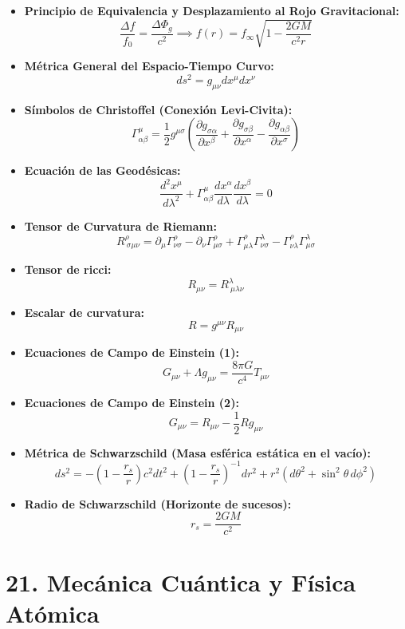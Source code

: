 \documentclass[11pt,a4paper]{article}
\begin{document}
\begin{itemize}
  \item \textbf{Principio de Equivalencia y Desplazamiento al Rojo Gravitacional:}
  \[
    \frac{\Delta f}{f_0} = \frac{\Delta\Phi_g}{c^2} \implies f(r) = f_\infty \sqrt{1 - \frac{2GM}{c^2 r}}
  \]
  \item \textbf{Métrica General del Espacio-Tiempo Curvo:}
  \[
    ds^2 = g_{\mu\nu} dx^\mu dx^\nu
  \]
  \item \textbf{Símbolos de Christoffel (Conexión Levi-Civita):}
  \[
    \Gamma^\mu_{\alpha\beta} = \frac{1}{2} g^{\mu\sigma} \left( \frac{\partial g_{\sigma\alpha}}{\partial x^\beta} + \frac{\partial g_{\sigma\beta}}{\partial x^\alpha} - \frac{\partial g_{\alpha\beta}}{\partial x^\sigma} \right)
  \]
  \item \textbf{Ecuación de las Geodésicas:}
  \[
    \frac{d^2 x^\mu}{d\lambda^2} + \Gamma^\mu_{\alpha\beta} \frac{dx^\alpha}{d\lambda} \frac{dx^\beta}{d\lambda} = 0
  \]
  \item \textbf{Tensor de Curvatura de Riemann:}
  \[
    R^\rho_{\ \sigma\mu\nu} = \partial_\mu \Gamma^\rho_{\nu\sigma} - \partial_\nu \Gamma^\rho_{\mu\sigma} + \Gamma^\rho_{\mu\lambda} \Gamma^\lambda_{\nu\sigma} - \Gamma^\rho_{\nu\lambda} \Gamma^\lambda_{\mu\sigma}
  \]
  \item \textbf{Tensor de ricci:}
  \[
    R_{\mu\nu} = R^\lambda_{\ \mu\lambda\nu}
  \]
  \item \textbf{Escalar de curvatura:}
  \[
    R = g^{\mu\nu} R_{\mu\nu}
  \]
  \item \textbf{Ecuaciones de Campo de Einstein (1):}
  \[
    G_{\mu\nu} + \Lambda g_{\mu\nu} = \frac{8\pi G}{c^4} T_{\mu\nu}
  \]
  \item \textbf{Ecuaciones de Campo de Einstein (2):}
  \[
    G_{\mu\nu} = R_{\mu\nu} - \frac{1}{2} R g_{\mu\nu}
  \]
  \item \textbf{Métrica de Schwarzschild (Masa esférica estática en el vacío):}
  \[
    ds^2 = -\left( 1 - \frac{r_s}{r} \right) c^2 dt^2 + \left( 1 - \frac{r_s}{r} \right)^{-1} dr^2 + r^2 (d\theta^2 + \sin^2\theta \, d\phi^2)
  \]
  \item \textbf{Radio de Schwarzschild (Horizonte de sucesos):}
  \[
    r_s = \frac{2GM}{c^2}
  \]
\end{itemize}

\section*{21. Mecánica Cuántica y Física Atómica}
\end{document}
